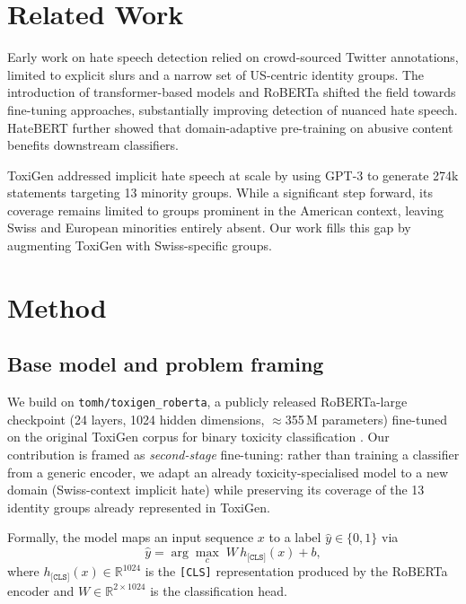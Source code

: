 \documentclass{article}
\begin{document}
\section{Related Work}
\label{sec:related_work}

Early work on hate speech detection relied on crowd-sourced Twitter annotations, limited to explicit slurs and a narrow set of US-centric identity groups. The introduction of transformer-based models and RoBERTa \cite{liu2019roberta} shifted the field towards fine-tuning approaches, substantially improving detection of nuanced hate speech. HateBERT \cite{caselli2021hatebert} further showed that domain-adaptive pre-training on abusive content benefits downstream classifiers.

ToxiGen \cite{hartvigsen2022toxigen} addressed implicit hate speech at scale by using GPT-3 to generate 274k statements targeting 13 minority groups. While a significant step forward, its coverage remains limited to groups prominent in the American context, leaving Swiss and European minorities entirely absent. Our work fills this gap by augmenting ToxiGen with Swiss-specific groups.

\section{Method}
\label{sec:method}

\subsection{Base model and problem framing}
We build on \texttt{tomh/toxigen\_roberta}, a publicly released RoBERTa-large checkpoint (24 layers, 1024 hidden dimensions, $\approx$355\,M parameters) fine-tuned on the original ToxiGen corpus for binary toxicity classification \cite{liu2019roberta, hartvigsen2022toxigen}. Our contribution is framed as \emph{second-stage} fine-tuning: rather than training a classifier from a generic encoder, we adapt an already toxicity-specialised model to a new domain (Swiss-context implicit hate) while preserving its coverage of the 13 identity groups already represented in ToxiGen.

Formally, the model maps an input sequence $x$ to a label $\hat{y} \in \{0, 1\}$ via
\begin{equation}
  \hat{y} = \arg\max_{c} \; W \, h_{\texttt{[CLS]}}(x) + b,
  \label{eq:argmax}
\end{equation}
where $h_{\texttt{[CLS]}}(x) \in \mathbb{R}^{1024}$ is the \texttt{[CLS]} representation produced by the RoBERTa encoder and $W \in \mathbb{R}^{2 \times 1024}$ is the classification head.
\end{document}
